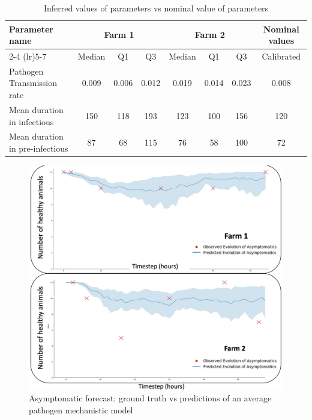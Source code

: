 \begin{enumerate}
    \begin{table}[h]
        \centering
        \renewcommand{\arraystretch}{1.2}
        \begin{tabular}{l ccc ccc c}
            \toprule
            \multirow{2}{*}{\textbf{Parameter name}} & \multicolumn{3}{c}{\textbf{Farm 1}} & \multicolumn{3}{c}{\textbf{Farm 2}} & \multirow{2}{*}{\textbf{Nominal values}} \\
            
            \cmidrule(lr){2-4} \cmidrule(lr){5-7} 
            & Median & Q1 & Q3 & Median & Q1 & Q3 & Calibrated \\
            \midrule
            Pathogen Transmission rate & 0.009 & 0.006 & 0.012 & 0.019 & 0.014 & 0.023 & 0.008 \\
            Mean duration in infectious & 150 & 118 & 193 & 123 & 100 & 156 & 120 \\
            Mean duration in pre-infectious & 87 & 68 & 115 & 76 & 58 & 100 & 72 \\
            \bottomrule
        \end{tabular}
        \caption{Inferred values of parameters vs nominal value of parameters}
        \label{tab:parameter_comparison}
    \end{table}

    \begin{figure}[H]
      \includegraphics[width=\linewidth]{figures/chap2/prognosis-chap1.jpg}
      \caption{Asymptomatic forecast: ground truth vs predictions of an average pathogen mechanistic model}
      \label{fig:prognosis-chap1}
    \end{figure}


\end{enumerate}

